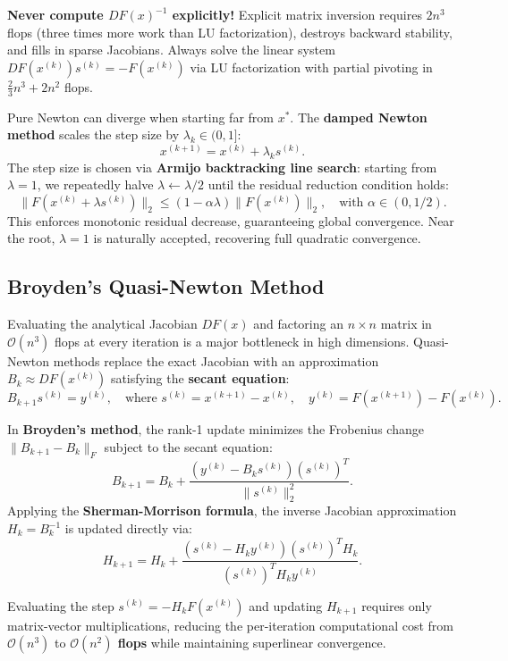 \begin{important}
    \textbf{Never compute $DF(x)^{-1}$ explicitly!} Explicit matrix inversion requires $2n^3$ flops (three times more work than LU factorization), destroys backward stability, and fills in sparse Jacobians. Always solve the linear system $DF(x^{(k)}) s^{(k)} = -F(x^{(k)})$ via LU factorization with partial pivoting in $\frac{2}{3}n^3 + 2n^2$ flops.
\end{important}

Pure Newton can diverge when starting far from $x^*$. The \textbf{damped Newton method} scales the step size by $\lambda_k \in (0, 1]$:
\begin{equation}
    x^{(k+1)} = x^{(k)} + \lambda_k s^{(k)}.
\end{equation}
The step size is chosen via \textbf{Armijo backtracking line search}: starting from $\lambda = 1$, we repeatedly halve $\lambda \leftarrow \lambda / 2$ until the residual reduction condition holds:
\begin{equation}
    \|F(x^{(k)} + \lambda s^{(k)})\|_2 \le (1 - \alpha \lambda) \|F(x^{(k)})\|_2, \quad \text{with } \alpha \in (0, 1/2).
\end{equation}
This enforces monotonic residual decrease, guaranteeing global convergence. Near the root, $\lambda = 1$ is naturally accepted, recovering full quadratic convergence.

\newpage
\subsection{Broyden’s Quasi-Newton Method}

Evaluating the analytical Jacobian $DF(x)$ and factoring an $n \times n$ matrix in $\mathcal{O}(n^3)$ flops at every iteration is a major bottleneck in high dimensions. Quasi-Newton methods replace the exact Jacobian with an approximation $B_k \approx DF(x^{(k)})$ satisfying the \textbf{secant equation}:
\begin{equation}
    B_{k+1} s^{(k)} = y^{(k)}, \quad \text{where } s^{(k)} = x^{(k+1)} - x^{(k)}, \quad y^{(k)} = F(x^{(k+1)}) - F(x^{(k)}).
\end{equation}

\begin{theorem}
    In \textbf{Broyden's method}, the rank-1 update minimizes the Frobenius change $\|B_{k+1} - B_k\|_F$ subject to the secant equation:
    \begin{equation}
        B_{k+1} = B_k + \frac{(y^{(k)} - B_k s^{(k)}) (s^{(k)})^T}{\|s^{(k)}\|_2^2}.
    \end{equation}
    Applying the \textbf{Sherman-Morrison formula}, the inverse Jacobian approximation $H_k = B_k^{-1}$ is updated directly via:
    \begin{equation}
        H_{k+1} = H_k + \frac{(s^{(k)} - H_k y^{(k)}) (s^{(k)})^T H_k}{(s^{(k)})^T H_k y^{(k)}}.
    \end{equation}
\end{theorem}

Evaluating the step $s^{(k)} = -H_k F(x^{(k)})$ and updating $H_{k+1}$ requires only matrix-vector multiplications, reducing the per-iteration computational cost from $\mathcal{O}(n^3)$ to \textbf{$\mathcal{O}(n^2)$ flops} while maintaining superlinear convergence.
